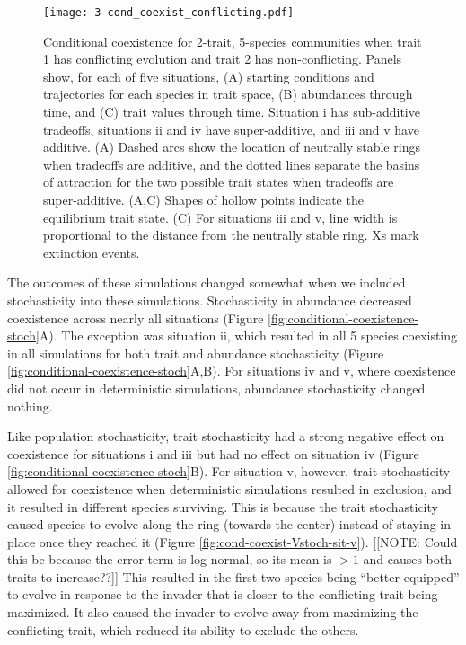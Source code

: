 \begin{figure}[ht!]
\centering
\texttt{[image: 3-cond\_coexist\_conflicting.pdf]}
\caption{Conditional coexistence for 2-trait, 5-species communities when trait 1 has 
    conflicting evolution and trait 2 has non-conflicting.
    Panels show, for each of five situations,
    (A) starting conditions and trajectories for each species in trait space, 
    (B) abundances through time, and 
    (C) trait values through time.
    Situation i has sub-additive tradeoffs, situations ii and iv have 
    super-additive, and iii and v have additive.
    (A) Dashed arcs show the location of neutrally stable rings
    when tradeoffs are additive, and 
    the dotted lines separate the basins of attraction for the two possible
    trait states when tradeoffs are super-additive.
    (A,C) Shapes of hollow points indicate the equilibrium trait state.
    (C) For situations iii and v, line width is proportional to the 
    distance from the neutrally stable ring.
    Xs mark extinction events.
}
\label{fig:conditional-coexistence}
\end{figure}


The outcomes of these simulations changed somewhat when we included stochasticity
into these simulations.
Stochasticity in abundance decreased coexistence across nearly all situations
(Figure \ref{fig:conditional-coexistence-stoch}A).
The exception was situation ii, which resulted in all 5 species coexisting 
in all simulations for both trait and abundance stochasticity
(Figure \ref{fig:conditional-coexistence-stoch}A,B).
For situations iv and v, where coexistence did not occur in deterministic
simulations, abundance stochasticity changed nothing.

Like population stochasticity, trait stochasticity had a strong negative 
effect on coexistence for situations i and iii but had no effect on
situation iv (Figure \ref{fig:conditional-coexistence-stoch}B).
For situation v, however, trait stochasticity allowed for coexistence
when deterministic simulations resulted in exclusion, 
and it resulted in different species surviving.
This is because the trait stochasticity caused species to evolve 
along the ring (towards the center) instead of staying in place once they 
reached it (Figure \ref{fig:cond-coexist-Vstoch-sit-v}).
[[NOTE: Could this be because the error term is log-normal, so its mean is
$> 1$ and causes both traits to increase??]]
This resulted in the first two species being ``better equipped'' to evolve in 
response to the invader that is closer to the conflicting trait being
maximized.
It also caused the invader to evolve away from maximizing the conflicting
trait, which reduced its ability to exclude the others.



